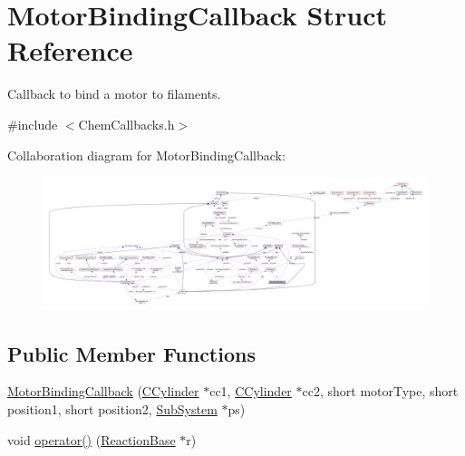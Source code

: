 \hypertarget{structMotorBindingCallback}{\section{Motor\+Binding\+Callback Struct Reference}
\label{structMotorBindingCallback}
}


Callback to bind a motor to filaments.  




{\ttfamily \#include $<$Chem\+Callbacks.\+h$>$}



Collaboration diagram for Motor\+Binding\+Callback\+:\nopagebreak
\begin{figure}[H]
\begin{center}
\leavevmode
\includegraphics[width=350pt]{structMotorBindingCallback__coll__graph}
\end{center}
\end{figure}
\subsection*{Public Member Functions}
\begin{DoxyCompactItemize}
\item 
\hyperlink{structMotorBindingCallback_a063a3eb832d1ac51e14261ce3af5aabe}{Motor\+Binding\+Callback} (\hyperlink{classCCylinder}{C\+Cylinder} $\ast$cc1, \hyperlink{classCCylinder}{C\+Cylinder} $\ast$cc2, short motor\+Type, short position1, short position2, \hyperlink{classSubSystem}{Sub\+System} $\ast$ps)
\item 
void \hyperlink{structMotorBindingCallback_a91333b9e848e1b77134cb20543d9c4b3}{operator()} (\hyperlink{classReactionBase}{Reaction\+Base} $\ast$r)
\end{DoxyCompactItemize}

